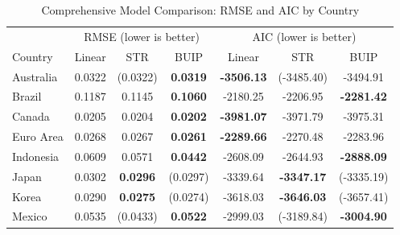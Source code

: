 \documentclass[a4paper,10pt,final]{article}    %
\begin{document}
\begin{table}[htbp]
    \centering
    \caption{Comprehensive Model Comparison: RMSE and AIC by Country}
    \label{tab:comprehensive_model_comparison}
    \begin{tabular}{l|ccc|ccc}
        \toprule
                       & \multicolumn{3}{c|}{RMSE (lower is better)} & \multicolumn{3}{c}{AIC (lower is better)}                                                                               \\
        Country        & Linear                                      & STR                                       & BUIP            & Linear            & STR               & BUIP              \\
        \midrule
        Australia      & 0.0322                                      & (0.0322)                                  & \textbf{0.0319} & \textbf{-3506.13} & (-3485.40)        & -3494.91          \\
        Brazil         & 0.1187                                      & 0.1145                                    & \textbf{0.1060} & -2180.25          & -2206.95          & \textbf{-2281.42} \\
        Canada         & 0.0205                                      & 0.0204                                    & \textbf{0.0202} & \textbf{-3981.07} & -3971.79          & -3975.31          \\
        Euro Area      & 0.0268                                      & 0.0267                                    & \textbf{0.0261} & \textbf{-2289.66} & -2270.48          & -2283.96          \\
        Indonesia      & 0.0609                                      & 0.0571                                    & \textbf{0.0442} & -2608.09          & -2644.93          & \textbf{-2888.09} \\
        Japan          & 0.0302                                      & \textbf{0.0296}                           & (0.0297)        & -3339.64          & \textbf{-3347.17} & (-3335.19)        \\
        Korea          & 0.0290                                      & \textbf{0.0275}                           & (0.0274)        & -3618.03          & \textbf{-3646.03} & (-3657.41)        \\
        Mexico         & 0.0535                                      & (0.0433)                                  & \textbf{0.0522} & -2999.03          & (-3189.84)        & \textbf{-3004.90} \\

\end{tabular}
\end{table}
\end{document}
